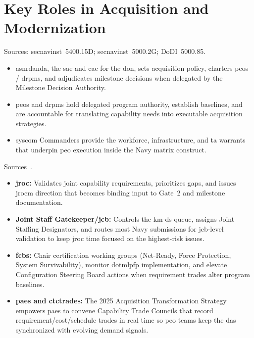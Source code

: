 \documentclass[../main.tex]{subfiles}
\begin{document}

\section{Key Roles in Acquisition and Modernization}
\begin{description}[style=nextline, labelsep=0.5em, font=\bfseries]
  \item[\textbf{Department acquisition governance.}]
        Sources: \ac{secnavinst}~5400.15D; \ac{secnavinst}~5000.2G; DoDI~5000.85.
        \begin{itemize}
          \item \ac{asnrdanda}, the \ac{sae} and \ac{cae} for the \ac{don}, sets acquisition policy, charters \acp{peo} / \acp{drpm}, and adjudicates milestone decisions when delegated by the Milestone Decision Authority.
          \item \acp{peo} and \acp{drpm} hold delegated program authority, establish baselines, and are accountable for translating capability needs into executable acquisition strategies.
          \item \ac{syscom} Commanders provide the workforce, infrastructure, and \ac{ta} warrants that underpin \ac{peo} execution inside the Navy matrix construct.
        \end{itemize}

  \item[\textbf{Joint requirements governance.}]
        Sources~\autocite{jcids-manual-2021,secwar-acq-transformation-2025}.
        \begin{itemize}
          \item \textbf{\ac{jroc}:} Validates joint capability requirements, prioritizes gaps, and issues \ac{jrocm} direction that becomes binding input to Gate~2 and milestone documentation.
          \item \textbf{Joint Staff Gatekeeper/\ac{jcb}:} Controls the \ac{km-ds} queue, assigns Joint Staffing Designators, and routes most Navy submissions for \ac{jcb}-level validation to keep \ac{jroc} time focused on the highest-risk issues.
          \item \textbf{\acp{fcb}:} Chair certification working groups (Net-Ready, Force Protection, System Survivability), monitor \ac{dotmlpfp} implementation, and elevate Configuration Steering Board actions when requirement trades alter program baselines.
\item \textbf{\acp{pae} and \acp{ctctrade}:} The 2025 Acquisition Transformation Strategy empowers \acp{pae} to convene Capability Trade Councils that record requirement/cost/schedule trades in real time so \ac{peo} teams keep the \ac{das} synchronized with evolving demand signals.
        \end{itemize}


\end{description}
\end{document}
